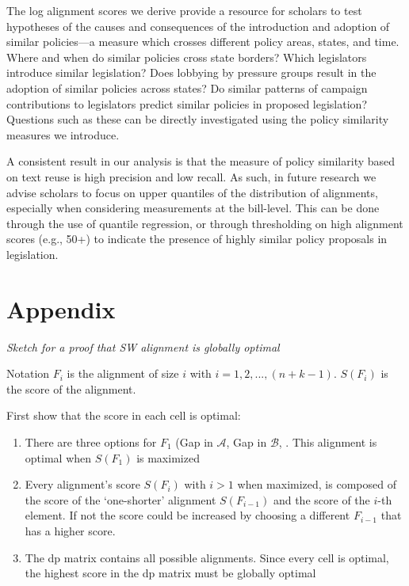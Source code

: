\documentclass[12pt]{article} %
\begin{document}
The log alignment scores we derive provide a resource for scholars to test hypotheses of the causes and consequences of the introduction and adoption of similar policies---a measure which crosses different policy areas, states, and time. Where and when do similar policies cross state borders? Which legislators introduce similar legislation? Does lobbying by pressure groups result in the adoption of similar policies across states? Do similar patterns of campaign contributions to legislators predict similar policies in proposed legislation? Questions such as these can be directly investigated using the policy similarity measures we introduce. 

A consistent result in our analysis is that the measure of policy similarity based on text reuse is high precision and low recall.  As such, in future research we advise scholars to focus on upper quantiles of the distribution of alignments, especially when considering measurements at the bill-level. This can be done through the use of quantile regression, or through thresholding on high alignment scores (e.g., 50+) to indicate the presence of highly similar policy proposals in legislation.

\clearpage




\clearpage

\section*{Appendix}

\textit{Sketch for a proof that SW alignment is globally optimal}

Notation $F_i$ is the alignment of size $i$ with $i = 1,2,...,(n + k - 1)$. $S(F_i)$ is the score of the alignment.

First show that the score in each cell is optimal:
\begin{enumerate}
\item There are three options for $F_1$ (Gap in $\mathcal{A}$, Gap in $\mathcal{B}$, . This alignment is optimal when $S(F_1)$ is maximized
\item Every alignment's score $S(F_i)$ with $i > 1$ when maximized, is composed of the score of the `one-shorter' alignment $S(F_{i-1})$ and the score of the $i$-th element. If not the score could be increased by choosing a different $F_{i-1}$ that has a higher score.
\item The dp matrix contains all possible alignments. Since every cell is optimal, the highest score in the dp matrix must be globally optimal
\end{enumerate}
\end{document}
